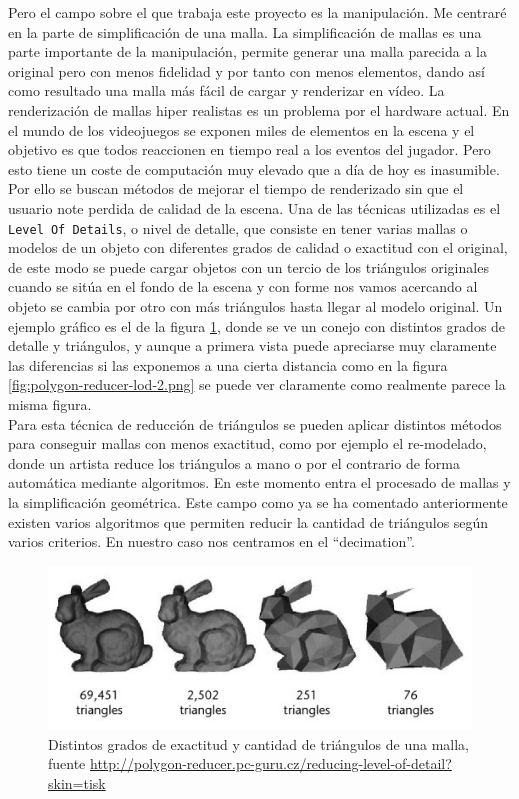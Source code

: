 Pero el campo sobre el que trabaja este proyecto es la manipulación. Me centraré en la parte de simplificación de una malla. La simplificación de mallas es una parte importante de la manipulación, permite generar una malla parecida a la original pero con menos fidelidad y por tanto con menos elementos, dando así como resultado una malla más fácil de cargar y renderizar en vídeo. La renderización de mallas hiper realistas es un problema por el hardware actual. En el mundo de los videojuegos se exponen miles de elementos en la escena y el objetivo es que todos reaccionen en tiempo real a los eventos del jugador. Pero esto tiene un coste de computación muy elevado que a día de hoy es inasumible. Por ello se buscan métodos de mejorar el tiempo de renderizado sin que el usuario note perdida de calidad de la escena. Una de las técnicas utilizadas es el \texttt{Level Of Details}, o nivel de detalle, que consiste en tener varias mallas o modelos de un objeto con diferentes grados de calidad o exactitud con el original, de este modo se puede cargar  objetos con un tercio de los triángulos originales cuando se sitúa en el fondo de la escena y con forme nos vamos acercando al objeto se cambia por otro con más triángulos hasta llegar al modelo original. Un ejemplo gráfico es el de la figura \ref{fig:polygon-reducer-lod-1.png}, donde se ve un conejo con distintos grados de detalle y triángulos, y aunque a primera vista puede apreciarse muy claramente las diferencias si las exponemos a una cierta distancia como en la figura \ref{fig:polygon-reducer-lod-2.png} se puede ver claramente como realmente parece la misma figura.\\

Para esta técnica de reducción de triángulos se pueden aplicar distintos métodos para conseguir mallas con menos exactitud, como por ejemplo el re-modelado, donde un artista reduce los triángulos a mano o por el contrario de forma automática mediante algoritmos. En este momento entra el procesado de mallas y la simplificación geométrica. Este campo como ya se ha comentado anteriormente existen varios algoritmos que permiten reducir la cantidad de triángulos según varios criterios. En nuestro caso nos centramos en el ``decimation''.

\begin{figure} %
	\centering
	\includegraphics[scale=0.8]{imagenes/polygon-reducer-lod-1.jpg} 
	\caption{ Distintos grados de exactitud y cantidad de triángulos de una malla, fuente \url{http://polygon-reducer.pc-guru.cz/reducing-level-of-detail?skin=tisk}} \label{fig:polygon-reducer-lod-1.png}
\end{figure}

